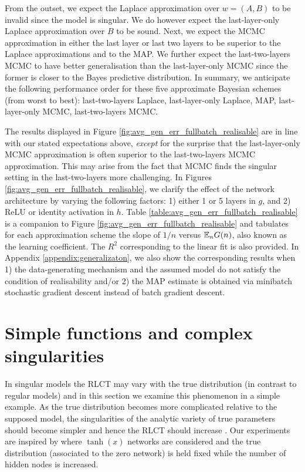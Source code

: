 \documentclass{article} %
\begin{document}
From the outset, we expect the Laplace approximation over $w = (A, B)$ to be invalid since the model is singular. We do however expect the last-layer-only Laplace approximation over $B$ to be sound. Next, we expect the MCMC approximation in either the last layer or last two layers to be  superior to the Laplace approximations and to the MAP. We further expect the last-two-layers MCMC to have better generalisation than the last-layer-only MCMC since the former is closer to the Bayes predictive distribution. In summary, we anticipate the following performance order for these five approximate Bayesian schemes (from worst to best): last-two-layers Laplace, last-layer-only Laplace, MAP, last-layer-only MCMC, last-two-layers MCMC.


The results displayed in Figure \ref{fig:avg_gen_err_fullbatch_realisable} are in line with our stated expectations above, \textit{except} for the surprise that the last-layer-only MCMC approximation is often superior to the last-two-layers MCMC approximation. This may arise from the fact that MCMC finds the singular setting in the last-two-layers more challenging. In Figures \ref{fig:avg_gen_err_fullbatch_realisable}, we clarify the effect of the network architecture by varying the following factors:  1) either 1 or 5 layers in $g$, and 2) ReLU or identity activation in $h$. Table \ref{table:avg_gen_err_fullbatch_realisable} is a companion to Figure \ref{fig:avg_gen_err_fullbatch_realisable} and tabulates for each approximation scheme the slope of $1/n$ versus ${\mathbb{E}}_n G(n)$, also known as the learning coefficient. The $R^2$ corresponding to the linear fit is also provided. 
In Appendix \ref{appendix:generalizaton}, we also show the corresponding results when 1) the data-generating mechanism and the assumed model do not satisfy the condition of realisability and/or 2) the MAP estimate is obtained via minibatch stochastic gradient descent instead of batch gradient descent. 



\section{Simple functions and complex singularities}\label{section:simple_func}

In singular models the RLCT may vary with the true distribution (in contrast to regular models) and in this section we examine this phenomenon in a simple example. As the true distribution becomes more complicated relative to the supposed model, the singularities of the analytic variety of true parameters should become simpler and hence the RLCT should increase \citep[\S 7.6]{watanabe_algebraic_2009}. Our experiments are inspired by \citep[\S 7.2]{watanabe_algebraic_2009} where $\operatorname{tanh}(x)$ networks are considered and the true distribution (associated to the zero network) is held fixed while the number of hidden nodes is increased.
\end{document}
